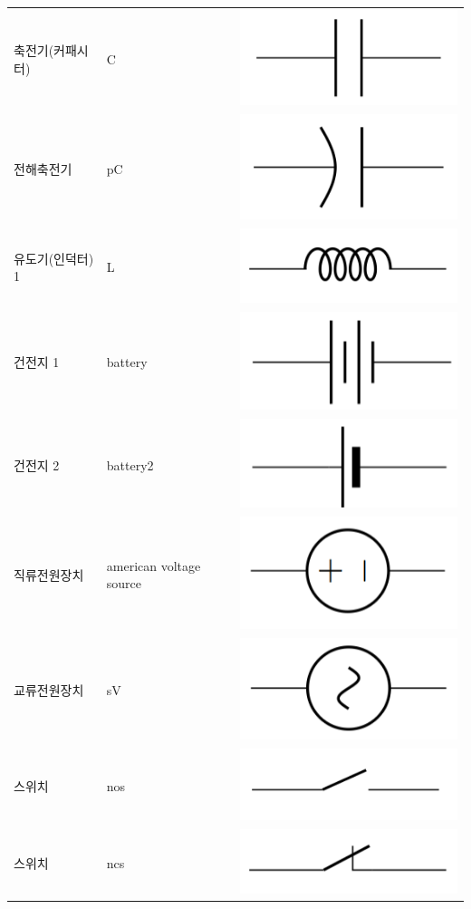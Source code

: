 \documentclass[12pt]{book}
\begin{document}
\begin{table}[]
\begin{tabular}{lll}
			축전기(커패시터)  & C                       & \includegraphics[height=0.045\linewidth]{./images/circuitikz_10.png}       \\
			전해축전기      & pC                      & \includegraphics[height=0.045\linewidth]{./images/circuitikz_11.png}       \\
			유도기(인덕터) 1 & L                       & \includegraphics[height=0.045\linewidth]{./images/circuitikz_12.png}       \\
			건전지 1      & battery                 &\includegraphics[height=0.045\linewidth]{./images/circuitikz_14.png}       \\
			건전지 2      & battery2                & \includegraphics[height=0.045\linewidth]{./images/circuitikz_15.png}       \\
			직류전원장치     & american voltage source & \includegraphics[height=0.045\linewidth]{./images/circuitikz_16.png}       \\
			교류전원장치     & sV                      & \includegraphics[height=0.045\linewidth]{./images/circuitikz_17.png}       \\
		 	스위치        & nos                     & \includegraphics[height=0.045\linewidth]{./images/circuitikz_18.png}       \\
			스위치 &  ncs                       & \includegraphics[height=0.045\linewidth]{./images/circuitikz_24.png}       \\

\end{tabular}
\end{table}
\end{document}
